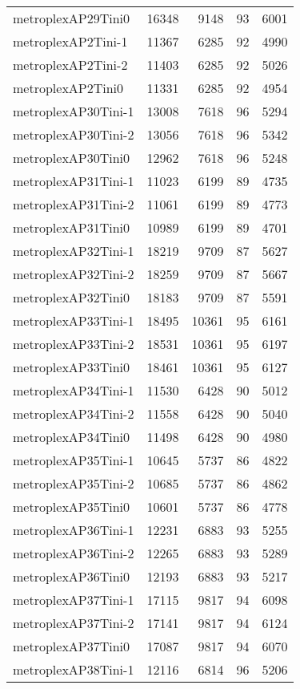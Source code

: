 \documentclass[../../../thesis.tex]{subfiles}
\begin{document}
\begin{longtable}{lrrrr}
metroplexAP29Tini0 & 16348 & 9148 & 93 & 6001 \\
metroplexAP2Tini-1 & 11367 & 6285 & 92 & 4990 \\
metroplexAP2Tini-2 & 11403 & 6285 & 92 & 5026 \\
metroplexAP2Tini0 & 11331 & 6285 & 92 & 4954 \\
metroplexAP30Tini-1 & 13008 & 7618 & 96 & 5294 \\
metroplexAP30Tini-2 & 13056 & 7618 & 96 & 5342 \\
metroplexAP30Tini0 & 12962 & 7618 & 96 & 5248 \\
metroplexAP31Tini-1 & 11023 & 6199 & 89 & 4735 \\
metroplexAP31Tini-2 & 11061 & 6199 & 89 & 4773 \\
metroplexAP31Tini0 & 10989 & 6199 & 89 & 4701 \\
metroplexAP32Tini-1 & 18219 & 9709 & 87 & 5627 \\
metroplexAP32Tini-2 & 18259 & 9709 & 87 & 5667 \\
metroplexAP32Tini0 & 18183 & 9709 & 87 & 5591 \\
metroplexAP33Tini-1 & 18495 & 10361 & 95 & 6161 \\
metroplexAP33Tini-2 & 18531 & 10361 & 95 & 6197 \\
metroplexAP33Tini0 & 18461 & 10361 & 95 & 6127 \\
metroplexAP34Tini-1 & 11530 & 6428 & 90 & 5012 \\
metroplexAP34Tini-2 & 11558 & 6428 & 90 & 5040 \\
metroplexAP34Tini0 & 11498 & 6428 & 90 & 4980 \\
metroplexAP35Tini-1 & 10645 & 5737 & 86 & 4822 \\
metroplexAP35Tini-2 & 10685 & 5737 & 86 & 4862 \\
metroplexAP35Tini0 & 10601 & 5737 & 86 & 4778 \\
metroplexAP36Tini-1 & 12231 & 6883 & 93 & 5255 \\
metroplexAP36Tini-2 & 12265 & 6883 & 93 & 5289 \\
metroplexAP36Tini0 & 12193 & 6883 & 93 & 5217 \\
metroplexAP37Tini-1 & 17115 & 9817 & 94 & 6098 \\
metroplexAP37Tini-2 & 17141 & 9817 & 94 & 6124 \\
metroplexAP37Tini0 & 17087 & 9817 & 94 & 6070 \\
metroplexAP38Tini-1 & 12116 & 6814 & 96 & 5206 \\

\end{longtable}
\end{document}
